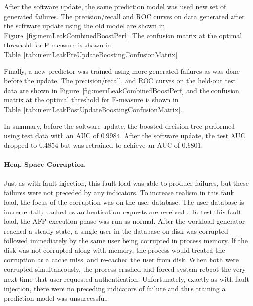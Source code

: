 \figMemLeakCombinedBoostPerf
\tabMemLeakPreUpdateBoostingConfusionMatrix

After the software update, the same prediction model was used new set of
generated failures.  The precision/recall and \ac{ROC} curves on data generated
after the software update using the old model are shown in
Figure~\ref{fig:memLeakCombinedBoostPerf}.  The confusion matrix at
the optimal threshold for F-measure is shown in
Table~\ref{tab:memLeakPreUpdateBoostingConfusionMatrix}

\tabMemLeakPostUpdateBoostingSameModelConfusionMatrix

Finally, a new predictor was trained using more generated failures as was done
before the update.  The precision/recall, and \ac{ROC} curves on the held-out
test data are shown in Figure~\ref{fig:memLeakCombinedBoostPerf} and the
confusion matrix at the optimal threshold for F-measure is shown in
Table~\ref{tab:memLeakPostUpdateBoostingConfusionMatrix}.

\tabMemLeakPostUpdateBoostingConfusionMatrix

In summary, before the software update, the boosted decision tree performed
using test data with an \ac{AUC} of $0.9984$.  After the software update, the
test \ac{AUC} dropped to $0.4854$ but was retrained to achieve an \ac{AUC} of
$0.9801$.

\paragraph{Heap Space Corruption}
Just as with fault injection, this fault load was able to produce failures, but
these failures were not preceded by any indicators.  To increase realism in
this fault load, the focus of the corruption was on the user database.  The
user database is incrementally cached as authentication requests are
received \citep{russinovich2009}.  To test this fault load, the \ac{AFP}
execution phase was run as normal.  After the workload generator reached a
steady state, a single user in the database on disk was corrupted followed
immediately by the same user being corrupted in process memory.  If the disk
was not corrupted along with memory, the process would treated the corruption
as a cache miss, and re-cached the user from disk.  When both were corrupted
simultaneously, the process crashed and forced system reboot the very next time
that user requested authentication.  Unfortunately, exactly as with fault
injection, there were no preceding indicators of failure and thus training a
prediction model was unsuccessful.

